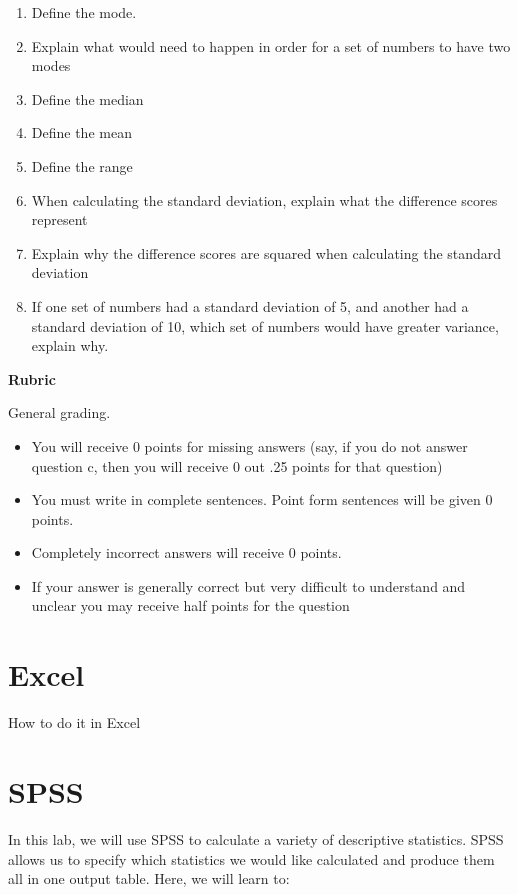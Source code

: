 \documentclass[
]{book}
\providecommand{\tightlist}{%
  \setlength{\itemsep}{0pt}\setlength{\parskip}{0pt}}
\begin{document}
\begin{enumerate}
\def\labelenumi{\arabic{enumi}.}
\tightlist
\item
  Define the mode.
\item
  Explain what would need to happen in order for a set of numbers to have two modes
\item
  Define the median
\item
  Define the mean
\item
  Define the range
\item
  When calculating the standard deviation, explain what the difference scores represent
\item
  Explain why the difference scores are squared when calculating the standard deviation
\item
  If one set of numbers had a standard deviation of 5, and another had a standard deviation of 10, which set of numbers would have greater variance, explain why.
\end{enumerate}

\textbf{Rubric}

General grading.

\begin{itemize}
\tightlist
\item
  You will receive 0 points for missing answers (say, if you do not answer question c, then you will receive 0 out .25 points for that question)
\item
  You must write in complete sentences. Point form sentences will be given 0 points.
\item
  Completely incorrect answers will receive 0 points.
\item
  If your answer is generally correct but very difficult to understand and unclear you may receive half points for the question
\end{itemize}

\hypertarget{excel-2}{%
\section{Excel}\label{excel-2}}

How to do it in Excel

\hypertarget{spss-2}{%
\section{SPSS}\label{spss-2}}

In this lab, we will use SPSS to calculate a variety of descriptive statistics. SPSS allows us to specify which statistics we would like calculated and produce them all in one output table. Here, we will learn to:
\end{document}
